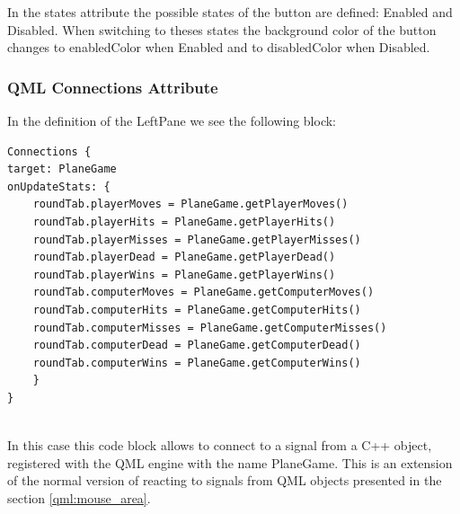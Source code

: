 In the states attribute the possible states of the button are defined: Enabled and Disabled. When switching to theses states the background color of the button changes to enabledColor when Enabled and to disabledColor when Disabled.

\subsubsection {QML Connections Attribute} \label{qml:connections}

In the definition of the LeftPane we see the following block:

\begin{lstlisting}
Connections {
target: PlaneGame
onUpdateStats: {
	roundTab.playerMoves = PlaneGame.getPlayerMoves()
	roundTab.playerHits = PlaneGame.getPlayerHits()
	roundTab.playerMisses = PlaneGame.getPlayerMisses()
	roundTab.playerDead = PlaneGame.getPlayerDead()
	roundTab.playerWins = PlaneGame.getPlayerWins()
	roundTab.computerMoves = PlaneGame.getComputerMoves()
	roundTab.computerHits = PlaneGame.getComputerHits()
	roundTab.computerMisses = PlaneGame.getComputerMisses()
	roundTab.computerDead = PlaneGame.getComputerDead()
	roundTab.computerWins = PlaneGame.getComputerWins()
	}
}
	
\end{lstlisting}

In this case this code block allows to connect to a signal from a C++ object, registered with the QML engine with the name PlaneGame. 
This is an extension of the normal version of reacting to signals from QML objects presented in the section \ref{qml:mouse_area}.
